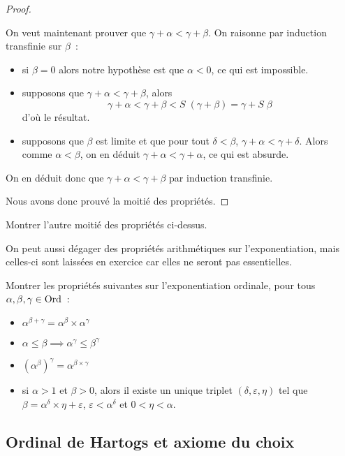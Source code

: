 \begin{proof}
\begin{itemize}
    On veut maintenant prouver que $\gamma + \alpha < \gamma + \beta$. On
    raisonne par induction transfinie sur $\beta$~:
    \begin{itemize}
    \item si $\beta = 0$ alors notre hypothèse est que $\alpha < 0$, ce qui est
      impossible.
    \item supposons que $\gamma + \alpha < \gamma + \beta$, alors
      \[\gamma + \alpha < \gamma + \beta < S\;(\gamma + \beta)
      = \gamma + S\;\beta\]
      d'où le résultat.
    \item supposons que $\beta$ est limite et que pour tout $\delta < \beta$,
      $\gamma + \alpha < \gamma + \delta$. Alors comme $\alpha < \beta$, on en
      déduit $\gamma + \alpha < \gamma + \alpha$, ce qui est absurde.
    \end{itemize}
    On en déduit donc que $\gamma + \alpha < \gamma + \beta$ par induction
    transfinie.
  \end{itemize}
  Nous avons donc prouvé la moitié des propriétés.
\end{proof}

\begin{exercise}
  Montrer l'autre moitié des propriétés ci-dessus.
\end{exercise}

On peut aussi dégager des propriétés arithmétiques sur l'exponentiation, mais
celles-ci sont laissées en exercice car elles ne seront pas essentielles.

\begin{exercise}
  Montrer les propriétés suivantes sur l'exponentiation ordinale, pour tous
  $\alpha,\beta,\gamma\in\operatorname{Ord}$~:
  \begin{itemize}
  \item $\alpha^{\beta+\gamma} = \alpha^\beta\times\alpha^\gamma$
  \item $\alpha \leq \beta \implies \alpha^\gamma\leq\beta^\gamma$
  \item $(\alpha^\beta)^\gamma = \alpha^{\beta\times\gamma}$
  \item si $\alpha > 1$ et $\beta >0$, alors il existe un unique triplet
    $(\delta,\varepsilon,\eta)$ tel que
    $\beta = \alpha^\delta\times\eta + \varepsilon$, $\varepsilon < \alpha^\delta$
    et $0 < \eta < \alpha$.
  \end{itemize}
\end{exercise}

\subsection{Ordinal de Hartogs et axiome du choix}\label{sbsct.Zorn}

